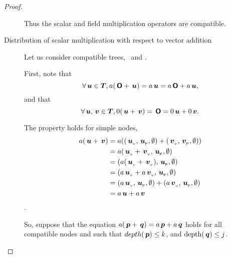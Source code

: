 \begin{proposition}
\begin{proof}
\begin{description}
      Thus the scalar and field multiplication operators are compatible.

      
    \item[Distribution of scalar multiplication with respect to vector addition]

      Let us consider compatible trees, \ and .
      
      First, note that \[\forall \,\boldsymbol{u} \in \boldsymbol{T}, a(\,\boldsymbol{\mathsf{O}} + \,\boldsymbol{u}) = a \,\boldsymbol{u} = a\,\boldsymbol{\mathsf{O}} + a \,\boldsymbol{u},\]
      and that \[\forall \,\boldsymbol{u},\,\boldsymbol{v}\in\boldsymbol{T}, 0 (\,\boldsymbol{u} + \,\boldsymbol{v}) = \,\boldsymbol{\mathsf{O}} = 0 \,\boldsymbol{u} + 0 \,\boldsymbol{v}.\]

      The property holds for simple nodes, 
      \begin{align*}
        a(\,\boldsymbol{u} + \,\boldsymbol{v}) &= a (({{\,\boldsymbol{u}}_{{}_{v}}}, {{\,\boldsymbol{u}}_{{}_{\mathsf{P}}}}, {\emptyset}) + ({{\,\boldsymbol{v}}_{{}_{v}}}, {{\,\boldsymbol{v}}_{{}_{\mathsf{P}}}}, {\emptyset}))\\ 
        &= a ({{\,\boldsymbol{u}}_{{}_{v}} + {\,\boldsymbol{v}}_{{}_{v}}}, {{\,\boldsymbol{u}}_{{}_{\mathsf{P}}}}, {\emptyset}) \\
        &= ({a({\,\boldsymbol{u}}_{{}_{v}} + {\,\boldsymbol{v}}_{{}_{v}})}, {{\,\boldsymbol{u}}_{{}_{\mathsf{P}}}}, {\emptyset}) \\
        &= ({a{\,\boldsymbol{u}}_{{}_{v}} + a{\,\boldsymbol{v}}_{{}_{v}}}, {{\,\boldsymbol{u}}_{{}_{\mathsf{P}}}}, {\emptyset}) \\
        &= ({a{\,\boldsymbol{u}}_{{}_{v}}}, {{\,\boldsymbol{u}}_{{}_{\mathsf{P}}}}, {\emptyset}) + ({a{\,\boldsymbol{v}}_{{}_{v}}}, {{\,\boldsymbol{u}}_{{}_{\mathsf{P}}}}, {\emptyset}) \\
        &= a \,\boldsymbol{u} + a \,\boldsymbol{v}
      \end{align*}.

      So, suppose that the equation \(a ( \,\boldsymbol{p} + \,\boldsymbol{q}) =
      a \,\boldsymbol{p} + a \,\boldsymbol{q}\) holds for all compatible nodes  and
       such that \(depth(\,\boldsymbol{p}) \leq k\), and
      \(\operatorname{depth}(\,\boldsymbol{q}) \leq j\).


\end{description}
\end{proof}
\end{proposition}
